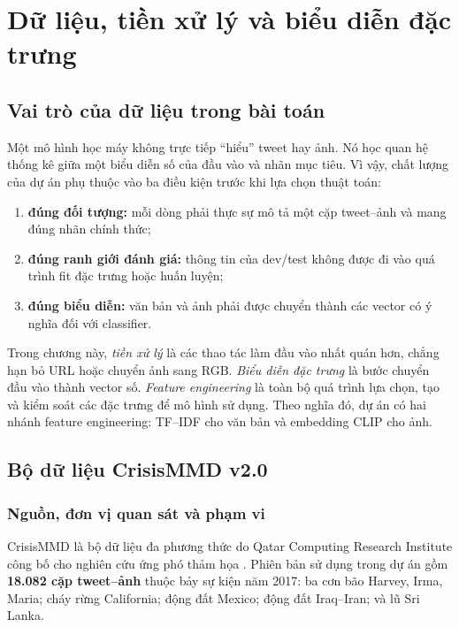 \chapter{Dữ liệu, tiền xử lý và biểu diễn đặc trưng}
\label{chap:dulieu}

\section{Vai trò của dữ liệu trong bài toán}

Một mô hình học máy không trực tiếp ``hiểu'' tweet hay ảnh. Nó học quan hệ thống kê
giữa một biểu diễn số của đầu vào và nhãn mục tiêu. Vì vậy, chất lượng của dự án phụ
thuộc vào ba điều kiện trước khi lựa chọn thuật toán:

\begin{enumerate}[leftmargin=*]
  \item \textbf{đúng đối tượng:} mỗi dòng phải thực sự mô tả một cặp tweet--ảnh và
        mang đúng nhãn chính thức;
  \item \textbf{đúng ranh giới đánh giá:} thông tin của dev/test không được đi vào
        quá trình fit đặc trưng hoặc huấn luyện;
  \item \textbf{đúng biểu diễn:} văn bản và ảnh phải được chuyển thành các vector
        có ý nghĩa đối với classifier.
\end{enumerate}

Trong chương này, \textit{tiền xử lý} là các thao tác làm đầu vào nhất quán hơn,
chẳng hạn bỏ URL hoặc chuyển ảnh sang RGB. \textit{Biểu diễn đặc trưng} là bước
chuyển đầu vào thành vector số. \textit{Feature engineering} là toàn bộ quá trình
lựa chọn, tạo và kiểm soát các đặc trưng để mô hình sử dụng. Theo nghĩa đó, dự án
có hai nhánh feature engineering: TF--IDF cho văn bản và embedding CLIP cho ảnh.

\section{Bộ dữ liệu CrisisMMD v2.0}

\subsection{Nguồn, đơn vị quan sát và phạm vi}

CrisisMMD là bộ dữ liệu đa phương thức do Qatar Computing Research Institute
công bố cho nghiên cứu ứng phó thảm họa \cite{crisismmd2018}. Phiên bản sử dụng
trong dự án gồm \textbf{18.082 cặp tweet--ảnh} thuộc bảy sự kiện năm 2017:
ba cơn bão Harvey, Irma, Maria; cháy rừng California; động đất Mexico; động đất
Iraq--Iran; và lũ Sri Lanka.

